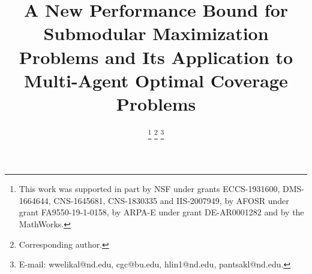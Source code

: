\documentclass[conference]{IEEEtran}
\begin{document}
\title{{\LARGE \textbf{
A New Performance Bound for Submodular Maximization Problems and Its Application to Multi-Agent Optimal Coverage Problems
}}}

\author{



\thanks{This work was supported in part by NSF under grants ECCS-1931600, DMS-1664644, CNS-1645681, CNS-1830335 and IIS-2007949, by AFOSR under grant FA9550-19-1-0158, by ARPA-E under grant DE-AR0001282 and by the MathWorks.
}
\thanks{ Corresponding author.}
\thanks{E-mail: wwelikal@nd.edu, cgc@bu.edu, hlin1@nd.edu, pantsakl@nd.edu.}}
\maketitle
\end{document}
